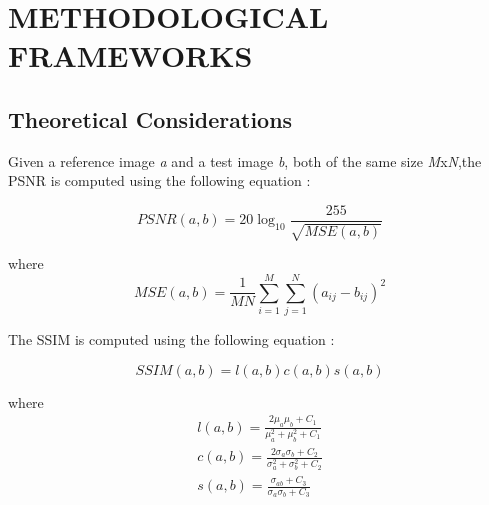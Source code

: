 
\chapter{METHODOLOGICAL FRAMEWORKS} %

\label{Chapter3} %








\section{Theoretical Considerations}
Given a reference image \textit{a} and a test image \textit{b}, both of the same size \textit{M}x\textit{N},the PSNR is computed using the following equation \citep{Hore2010}:

\begin{equation}
PSNR(a,b) = 20 \log_{10}\frac{255}{\sqrt{MSE(a,b)}}
\end{equation}

where
\begin{equation}
MSE(a,b) = \frac{1}{MN} \sum\limits_{i=1}^{M} \sum\limits_{j=1}^{N} (a_{ij}-b_{ij})^2
\end{equation}

The SSIM is computed using the following equation \citep{Hore2010}:

\begin{equation}
SSIM(a,b) = l(a,b) c(a,b) s(a,b)
\end{equation}

where
\begin{eqnarray}
l(a,b) = \frac{2\mu_a\mu_b+C_1}{\mu_a^2+\mu_b^2+C_1} \label{eqn:luminance_ssim}\\
c(a,b) = \frac{2\sigma_a\sigma_b+C_2}{\sigma_a^2+\sigma_b^2+C_2}\label{eqn:contrast_ssim}\\
s(a,b) = \frac{\sigma_{ab}+C_3}{\sigma_a\sigma_b+C_3}\label{eqn:structure_ssim}
\end{eqnarray}

